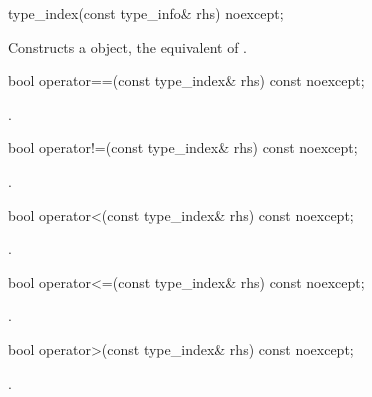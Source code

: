 %
\begin{itemdecl}
type_index(const type_info& rhs) noexcept;
\end{itemdecl}

\begin{itemdescr}
\pnum
\effects Constructs a  object, the equivalent of .
\end{itemdescr}

%
\begin{itemdecl}
bool operator==(const type_index& rhs) const noexcept;
\end{itemdecl}

\begin{itemdescr}
\pnum
\returns {}.
\end{itemdescr}

%
\begin{itemdecl}
bool operator!=(const type_index& rhs) const noexcept;
\end{itemdecl}

\begin{itemdescr}
\pnum
\returns {}.
\end{itemdescr}

%
\begin{itemdecl}
bool operator<(const type_index& rhs) const noexcept;
\end{itemdecl}

\begin{itemdescr}
\pnum
\returns {}.
\end{itemdescr}

%
\begin{itemdecl}
bool operator<=(const type_index& rhs) const noexcept;
\end{itemdecl}

\begin{itemdescr}
\pnum
\returns {}.
\end{itemdescr}

%
\begin{itemdecl}
bool operator>(const type_index& rhs) const noexcept;
\end{itemdecl}

\begin{itemdescr}
\pnum
\returns {}.
\end{itemdescr}

